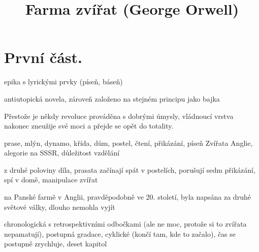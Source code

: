 \documentclass{article}
\title{\vspace{-2cm}Farma zvířat (George Orwell)\vspace{-2cm}}
\date{}
\author{}
\begin{document}
\maketitle
\section{První část.}
\begin{description}
    \setlength\itemsep{0.15em}
    \item[druh:] epika s lyrickými prvky (píseň, báseň)
    \item[žánr:] antiutopická novela, zároveň založeno na stejném principu jako bajka
    \item[téma:] Přestože je někdy revoluce prováděna s dobrými úmysly, vládnoucí vrstva nakonec zneužije své moci a přejde se opět do totality.
    \item[motivy:] prase, mlýn, dynamo, křída, dům, postel, čtení, přikázání, píseň Zvířata Anglie, alegorie na SSSR, důležitost vzdělání
    \item[zařazení výňatku do kontextu díla:] z druhé poloviny díla, prasata začínají spát v postelích, porušují sedm přikázání, spí v domě, manipulace zvířat
    \item[časoprostor:] na Panské farmě v Anglii, pravděpodobně ve 20. století, byla napsána za druhé světové války, dlouho nemohla vyjít
    \item[kompoziční výstavba:] chronologická s retrospektivními odbočkami (ale ne moc, protože si to zvířata nepamatují), postupná gradace, cyklické (končí tam, kde to začalo), čas se postupně zrychluje, deset kapitol
\end{description}
\end{document}
